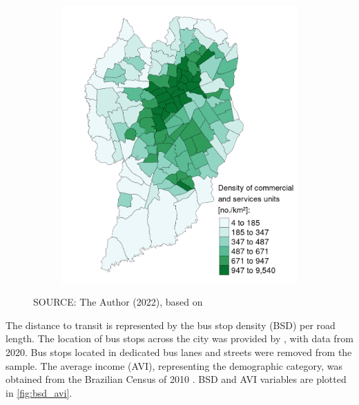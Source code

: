 \begin{figure}[!htbp]
\begin{subfigure}{0.5\textwidth}
        \includegraphics{fig/map_DCSU.png}
    \end{subfigure}
    \label{fig:snd_dcsu}
    \par SOURCE: The Author (2022), based on \textcite{IPPUC2018b,IPPUC2021}
\end{figure}

The distance to transit is represented by the bus stop density (BSD) per road length. The location of bus stops across the city was provided by \textcite{IPPUC2020a}, with data from 2020. Bus stops located in dedicated bus lanes and streets were removed from the sample. The average income (AVI), representing the demographic category, was obtained from the Brazilian Census of 2010 \cite{IBGE2010}. BSD and AVI variables are plotted in \autoref{fig:bsd_avi}. 

